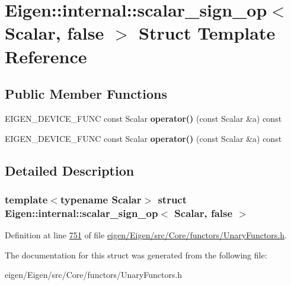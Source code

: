 \hypertarget{struct_eigen_1_1internal_1_1scalar__sign__op_3_01_scalar_00_01false_01_4}{}\section{Eigen\+:\+:internal\+:\+:scalar\+\_\+sign\+\_\+op$<$ Scalar, false $>$ Struct Template Reference}
\label{struct_eigen_1_1internal_1_1scalar__sign__op_3_01_scalar_00_01false_01_4}
\subsection*{Public Member Functions}
\begin{DoxyCompactItemize}
\item 
\mbox{\label{struct_eigen_1_1internal_1_1scalar__sign__op_3_01_scalar_00_01false_01_4_a909551c134130cb907fd59bc25490273}} 
E\+I\+G\+E\+N\+\_\+\+D\+E\+V\+I\+C\+E\+\_\+\+F\+U\+NC const Scalar {\bfseries operator()} (const Scalar \&a) const
\item 
\mbox{\label{struct_eigen_1_1internal_1_1scalar__sign__op_3_01_scalar_00_01false_01_4_a909551c134130cb907fd59bc25490273}} 
E\+I\+G\+E\+N\+\_\+\+D\+E\+V\+I\+C\+E\+\_\+\+F\+U\+NC const Scalar {\bfseries operator()} (const Scalar \&a) const
\end{DoxyCompactItemize}


\subsection{Detailed Description}
\subsubsection*{template$<$typename Scalar$>$\newline
struct Eigen\+::internal\+::scalar\+\_\+sign\+\_\+op$<$ Scalar, false $>$}



Definition at line \hyperlink{eigen_2_eigen_2src_2_core_2functors_2_unary_functors_8h_source_l00751}{751} of file \hyperlink{eigen_2_eigen_2src_2_core_2functors_2_unary_functors_8h_source}{eigen/\+Eigen/src/\+Core/functors/\+Unary\+Functors.\+h}.



The documentation for this struct was generated from the following file\+:\begin{DoxyCompactItemize}
\item 
eigen/\+Eigen/src/\+Core/functors/\+Unary\+Functors.\+h\end{DoxyCompactItemize}
